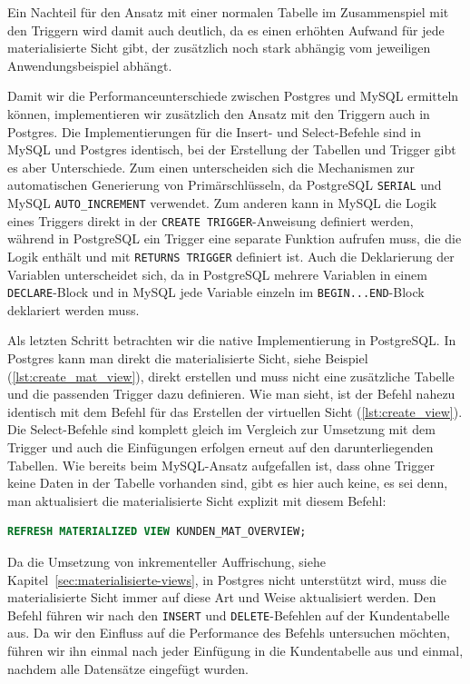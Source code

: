 Ein Nachteil für den Ansatz mit einer normalen Tabelle im Zusammenspiel mit den Triggern wird damit auch deutlich, da es einen erhöhten Aufwand für jede materialisierte Sicht gibt, der zusätzlich noch stark abhängig vom jeweiligen Anwendungsbeispiel abhängt.

Damit wir die Performanceunterschiede zwischen Postgres und MySQL ermitteln können, implementieren wir zusätzlich den Ansatz mit den Triggern auch in Postgres.
Die Implementierungen für die Insert- und Select-Befehle sind in MySQL und Postgres identisch, bei der Erstellung der Tabellen und Trigger gibt es aber Unterschiede.
Zum einen unterscheiden sich die Mechanismen zur automatischen Generierung von Primärschlüsseln, da PostgreSQL \texttt{SERIAL} und MySQL \texttt{AUTO\_INCREMENT} verwendet.
Zum anderen kann in MySQL die Logik eines Triggers direkt in der \texttt{CREATE TRIGGER}-Anweisung definiert werden, während in PostgreSQL ein Trigger eine separate Funktion aufrufen muss, die die Logik enthält und mit \texttt{RETURNS TRIGGER} definiert ist.
Auch die Deklarierung der Variablen unterscheidet sich, da in PostgreSQL mehrere Variablen in einem \texttt{DECLARE}-Block und in MySQL jede Variable einzeln im \texttt{BEGIN...END}-Block deklariert werden muss.

Als letzten Schritt betrachten wir die native Implementierung in PostgreSQL\@.
In Postgres kann man direkt die materialisierte Sicht, siehe Beispiel (\ref{lst:create_mat_view}), direkt erstellen und muss nicht eine zusätzliche Tabelle und die passenden Trigger dazu definieren.
Wie man sieht, ist der Befehl nahezu identisch mit dem Befehl für das Erstellen der virtuellen Sicht (\ref{lst:create_view}).
Die Select-Befehle sind komplett gleich im Vergleich zur Umsetzung mit dem Trigger und auch die Einfügungen erfolgen erneut auf den darunterliegenden Tabellen.
Wie bereits beim MySQL-Ansatz aufgefallen ist, dass ohne Trigger keine Daten in der Tabelle vorhanden sind, gibt es hier auch keine, es sei denn, man aktualisiert die materialisierte Sicht explizit mit diesem Befehl:

\vspace{-5pt}
\begin{lstlisting}[language=SQL,caption=Aktualisierung der materialisierten Sicht,label={lst:refresh-materialized-view}]
REFRESH MATERIALIZED VIEW KUNDEN_MAT_OVERVIEW;
\end{lstlisting}
\vspace{-5pt}

Da die Umsetzung von inkrementeller Auffrischung, siehe Kapitel~\ref{sec:materialisierte-views}, in Postgres nicht unterstützt wird, muss die materialisierte Sicht immer auf diese Art und Weise aktualisiert werden.
Den Befehl führen wir nach den \texttt{INSERT} und \texttt{DELETE}-Befehlen auf der Kundentabelle aus.
Da wir den Einfluss auf die Performance des Befehls untersuchen möchten, führen wir ihn einmal nach jeder Einfügung in die Kundentabelle aus und einmal, nachdem alle Datensätze eingefügt wurden.

